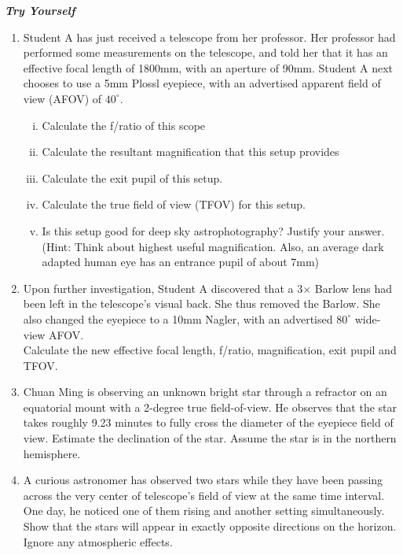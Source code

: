 \documentclass[a4paper,12pt]{extarticle}
\begin{document}
\clearpage
\textbf{\textit{Try Yourself}}
\begin{enumerate}[\textbf{T1.}]	
\item  Student A has just received a telescope from her professor. Her professor had performed some measurements on the telescope, and told her that it has an effective focal length of 1800mm, with an aperture of 90mm. Student A next chooses to use a 5mm Plossl eyepiece, with an advertised apparent field of view (AFOV) of $40^\circ$.
\begin{enumerate}[i.]
	\item Calculate the f/ratio of this scope
	\item Calculate the resultant magnification that this setup provides
	\item Calculate the exit pupil of this setup.
	\item Calculate the true field of view (TFOV) for this setup.
	\item Is this setup good for deep sky astrophotography? Justify your answer.\\
	(Hint: Think about highest useful magnification. Also, an average dark adapted human eye has an entrance pupil of about 7mm)
\end{enumerate}

\item  Upon further investigation, Student A discovered that a 3$\times$ Barlow lens had been left in the telescope’s visual back. She thus removed the Barlow. She also changed the eyepiece to a 10mm Nagler, with an advertised $80^\circ$ wide-view AFOV.\\

Calculate the new effective focal length, f/ratio, magnification, exit pupil and TFOV.

\item Chuan Ming is observing an unknown bright star through a refractor on an equatorial mount with a
2-degree true field-of-view. He observes that the star takes roughly 9.23 minutes to fully cross the
diameter of the eyepiece field of view. Estimate the declination of the star. Assume the star is in the
northern hemisphere.

\item A curious astronomer has observed two stars while they have been passing across the very center of telescope’s field of view at the same time interval. One day, he noticed one of them rising and another setting simultaneously. Show that the stars will appear in exactly opposite directions on the horizon. Ignore any atmospheric effects.


\end{enumerate}
\end{document}
